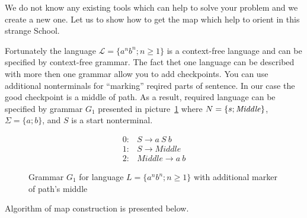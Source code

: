 We do not know any existing tools which can help to solve your problem and we create a new one.
Let us to show how to get the map which help to orient in this strange School.

Fortunately the language $\mathcal{L} = \{a^n b^n; n \geq 1\}$ is a context-free language and can be specified by context-free grammar. 
The fact thet one language can be described with more then one grammar allow you to add checkpoints. 
You can use additional nonterminals for ``marking'' reqired parts of sentence.
In our case the good checkpoint is a middle of path.
As a result, required language can be specified by grammar $G_1$ presented in picture~\ref{grammarG} where $N = \{s; \text{\textit{Middle}}\}$, $\Sigma = \{a; b\}$, and $S$ is a start nonterminal.

\begin{figure}[h]
   \begin{center}
   \[
\begin{array}{rl}
   0:& S \rightarrow a \ S \ b \\
   1:& S \rightarrow Middle \\
   2:& Middle \rightarrow a \ b
\end{array}
\]

   \caption{Grammar $G_1$ for language $L=\{a^n b^n; n \geq 1\}$ with additional marker of path's middle}
   \label{grammarG}        
   \end{center}
\end{figure}

Algorithm of map construction is presented below.
